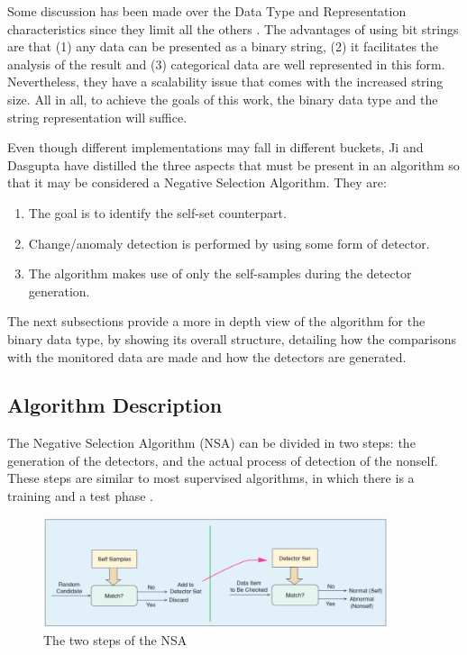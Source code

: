 Some discussion has been made over the Data Type and Representation characteristics since they limit all the others \cite{RevisitingNSA2007} \cite{NSAResearch2021} \cite{ICBook2009}. The advantages of using bit strings are that (1) any data can be presented as a binary string, (2) it facilitates the analysis of the result and (3) categorical data are well represented in this form. Nevertheless, they have a scalability issue that comes with the increased string size. All in all, to achieve the goals of this work, the binary data type and the string representation will suffice.

Even though different implementations may fall in different buckets, Ji and Dasgupta \cite{RevisitingNSA2007} have distilled the three aspects that must be present in an algorithm so that it may be considered a Negative Selection Algorithm. They are:
\begin{enumerate}
    \item The goal is to identify the self-set counterpart.
    \item Change/anomaly detection is performed by using some form of detector. 
    \item The algorithm makes use of only the self-samples during the detector generation.
  \end{enumerate}

The next subsections provide a more in depth view of the algorithm for the binary data type, by showing its overall structure, detailing how the comparisons with the monitored data are made and how the detectors are generated. 


\subsection{Algorithm Description} \label{sec:bgNSAOverview}

The Negative Selection Algorithm (NSA) can be divided in two steps: the generation of the detectors, and the actual process of detection of the nonself. These steps are similar to most supervised algorithms, in which there is a training and a test phase \cite{NSAResearch2021}. 

\begin{figure}[!h]
	\centering
	\includegraphics[width=0.9\textwidth, keepaspectratio]{img/NSA.png}
	\caption{The two steps of the NSA~ \cite{NSAResearch2021} }
	\label{fig:NSAOverview}
\end{figure}

